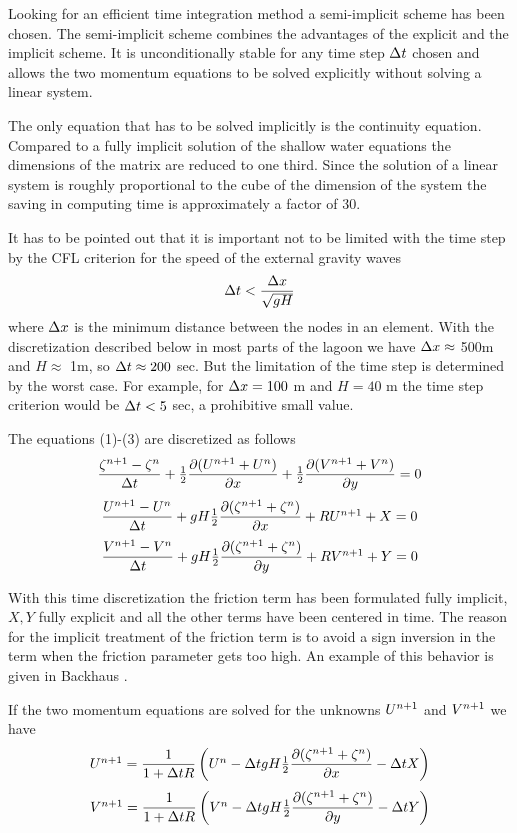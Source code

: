Looking for an efficient time integration method
a semi-implicit scheme has been chosen.
The semi-implicit scheme combines the advantages of
the explicit and the implicit scheme. It is unconditionally stable for any
time step $\mbox{$\Delta t$}$ chosen and allows the two momentum equations to be
solved explicitly without solving a linear system. 

The only equation
that has to be solved implicitly is the continuity equation. Compared
to a fully implicit solution of the shallow water equations the dimensions
of the matrix are reduced to one third. Since the solution of a linear
system is roughly proportional to the cube of the dimension of the system
the saving in computing time is approximately a factor of 30.

It has to be pointed out that it is important not to be limited with the time
step by the CFL criterion for the speed of the external gravity waves
\[
        \mbox{$\Delta t$} < \frac{\mbox{$\Delta x$}}{\sqrt{gH}}
\]
where $\mbox{$\Delta x$}$ is the minimum distance between the nodes in an element.
With the discretization described below in most parts of the lagoon
we have $\mbox{$\Delta x$} \approx$ 500m and $H \approx$ 1m, so $\mbox{$\Delta t$} \approx 200$ sec.
But the limitation of the time step is determined by the worst case.
For example, for $\mbox{$\Delta x$} = 100$ m and $H = 40$ m
the time step criterion would be $\mbox{$\Delta t$} < 5$ sec, a
prohibitive small value.

The equations (1)-(3) are discretized as follows
\begin{equation}
\label{zn}
\frac{\mbox{$\zeta^{n+1}$}-\mbox{$\zeta^{n}$}}{\mbox{$\Delta t$}}
                        + \mbox{$\frac{1}{2}$} \frac{\mbox{$\partial$} (\mbox{$U^{n+1}$} + \mbox{$U^{n}$})}{\mbox{$\partial$} x}
                        + \mbox{$\frac{1}{2}$} \frac{\mbox{$\partial$} (\mbox{$V^{n+1}$} + \mbox{$V^{n}$})}{\mbox{$\partial$} y} = 0
\end{equation}
\begin{equation}
\frac{\mbox{$U^{n+1}$}-\mbox{$U^{n}$}}{\mbox{$\Delta t$}} + gH \mbox{$\frac{1}{2}$} \frac{\mbox{$\partial$} (\mbox{$\zeta^{n+1}$} + \mbox{$\zeta^{n}$})}{\mbox{$\partial$} x} + R \mbox{$U^{n+1}$} + X = 0
\end{equation}
\begin{equation}
\frac{\mbox{$V^{n+1}$}-\mbox{$V^{n}$}}{\mbox{$\Delta t$}} + gH \mbox{$\frac{1}{2}$} \frac{\mbox{$\partial$} (\mbox{$\zeta^{n+1}$} + \mbox{$\zeta^{n}$})}{\mbox{$\partial$} y} + R \mbox{$V^{n+1}$} + Y = 0
\end{equation}

With this time discretization the friction term has been formulated
fully implicit, $X,Y$ fully explicit and all the other terms
have been centered in time. The reason for the implicit treatment
of the friction term is to avoid a sign inversion in the term when
the friction parameter gets too high. An example of this behavior is
given in Backhaus \cite{Backhaus83}.

If the two momentum equations are solved for the unknowns $\mbox{$U^{n+1}$}$ and $\mbox{$V^{n+1}$}$
we have
\begin{equation}
\label{un}
\mbox{$U^{n+1}$} = \frac{1}{1+\mbox{$\Delta t$} R} \left(  \mbox{$U^{n}$} - \mbox{$\Delta t$} gH \mbox{$\frac{1}{2}$} \frac{\mbox{$\partial$} (\mbox{$\zeta^{n+1}$} + \mbox{$\zeta^{n}$})}{\mbox{$\partial$} x} - \mbox{$\Delta t$} X  \right)
\end{equation}
\begin{equation}
\label{vn}
\mbox{$V^{n+1}$} = \frac{1}{1+\mbox{$\Delta t$} R} \left(  \mbox{$V^{n}$} - \mbox{$\Delta t$} gH \mbox{$\frac{1}{2}$} \frac{\mbox{$\partial$} (\mbox{$\zeta^{n+1}$} + \mbox{$\zeta^{n}$})}{\mbox{$\partial$} y} - \mbox{$\Delta t$} Y  \right)
\end{equation}


